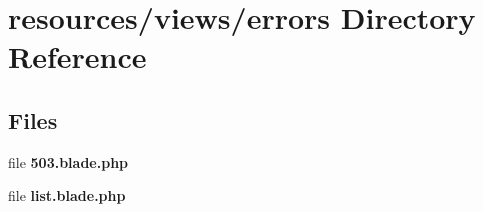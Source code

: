 \section{resources/views/errors Directory Reference}
\label{dir_ed6a0090eb7b48d936687446e9387235}
\subsection*{Files}
\begin{DoxyCompactItemize}
\item 
file {\bf 503.\+blade.\+php}
\item 
file {\bf list.\+blade.\+php}
\end{DoxyCompactItemize}
